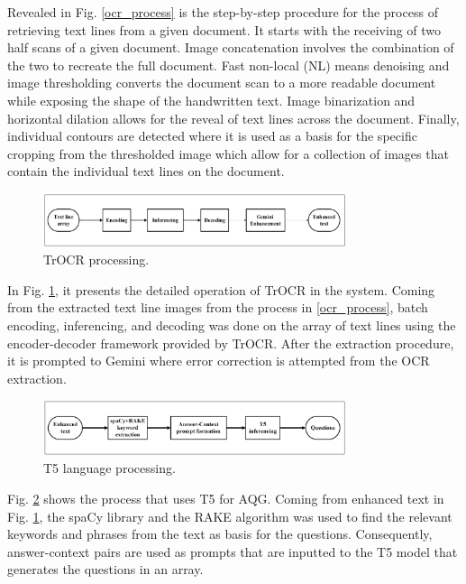 \documentclass[conference]{IEEEtran}
\begin{document}
\newpage
\indent Revealed in Fig. \ref{ocr_process} is the step-by-step 
procedure for the process of retrieving text lines from 
a given document. It starts with the receiving of two half 
scans of a given document. Image concatenation involves 
the combination of the two to recreate the full document. 
Fast non-local (NL) means denoising and image thresholding 
converts the document scan to a more readable document while 
exposing the shape of the handwritten text. Image binarization 
and horizontal dilation allows for the reveal of text 
lines across the document. Finally, individual contours 
are detected where it is used as a basis for the specific 
cropping from the thresholded image which allow for a collection of 
images that contain the individual text lines on the document.
\hfill
\begin{figure}[H]
\centerline{\includegraphics[width=3.5in]{trocr_process.png}}
\vspace{-0.4cm}
\caption{TrOCR processing.} 
\label{trocr_process}
\end{figure}
\indent In Fig. \ref{trocr_process}, it presents the detailed operation 
of TrOCR in the system. Coming from the extracted text line images 
from the process in \ref{ocr_process}, batch encoding, inferencing, and 
decoding was done on the array of text lines using the encoder-decoder 
framework provided by TrOCR. After the extraction procedure, it is 
prompted to Gemini where error correction is attempted from the 
OCR extraction.
\hfill
\begin{figure}[H]
\centerline{\includegraphics[width=3.5in]{aqg_process.png}}
\vspace{-0.4cm}
\caption{T5 language processing.} 
\label{aqg_process}
\end{figure}
\indent Fig. \ref{aqg_process} shows the process that uses T5
for AQG. Coming from enhanced text in Fig. \ref{trocr_process}, 
the spaCy library and the RAKE algorithm was used to find the 
relevant keywords and phrases from the text as basis for the questions. 
Consequently, answer-context pairs are used as prompts that are inputted 
to the T5 model that generates the questions in an array. 
\vspace{0.3cm}
\end{document}
